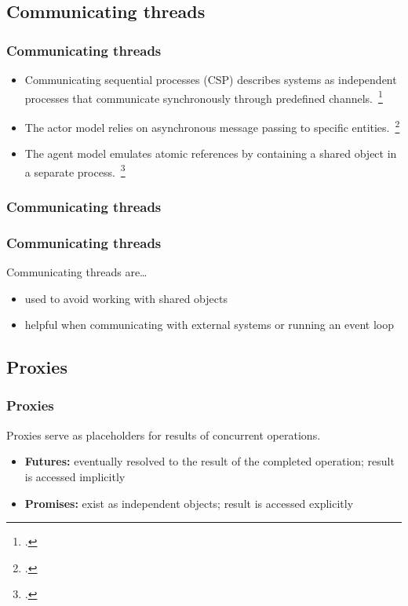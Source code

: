 \documentclass{beamer}
\begin{document}
  \subsection{Communicating threads}

  \begin{frame}
    \frametitle{Communicating threads}

    \begin{itemize}
      \item Communicating sequential processes (CSP) describes systems as independent processes that communicate synchronously through predefined channels.~\footcite{Hoare1978}
      \item The actor model relies on asynchronous message passing to specific entities.~\footcite{Agha1986}
      \item The agent model emulates atomic references by containing a shared object in a separate process.~\footcite{Swalens2014}
    \end{itemize}
  \end{frame}

  \begin{frame}
    \frametitle{Communicating threads}
  \end{frame}

  \begin{frame}
    \frametitle{Communicating threads}

    Communicating threads are\ldots

    \begin{itemize}
      \item used to avoid working with shared objects
      \item helpful when communicating with external systems or running an event loop
    \end{itemize}
  \end{frame}

  \subsection{Proxies}

  \begin{frame}
    \frametitle{Proxies}

    Proxies serve as placeholders for results of concurrent operations.

    \begin{itemize}
      \item \textbf{Futures:} eventually resolved to the result of the completed operation; result is accessed implicitly
      \item \textbf{Promises:} exist as independent objects; result is accessed explicitly
    \end{itemize}
  \end{frame}
\end{document}
